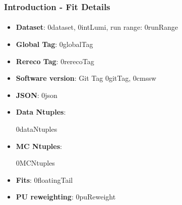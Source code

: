 
\begin{frame}
\frametitle{Introduction - Fit Details}
\framesubtitle{\invMassVarName}

\vspace{10mm}


\begin{itemize}
\item \textbf{Dataset}: 0dataset, 0intLumi, run range: 0runRange
\item \textbf{Global Tag}: 0globalTag
\item \textbf{Rereco Tag}: 0rerecoTag
\item \textbf{Software version}: Git Tag 0gitTag, 0cmssw
\item \textbf{JSON}: 0json
\item \textbf{Data Ntuples}: \\
\begin{ lstlisting}  
{\tiny 0dataNtuples }
\end{ lstlisting}
\item \textbf{MC Ntuples}: \\
\begin{ lstlisting} 
{\tiny 0MCNtuples }
\end{ lstlisting}
\item \textbf{Fits}: 0floatingTail
\item \textbf{PU reweighting}: 0puReweight


\end{itemize}

\end{frame}








